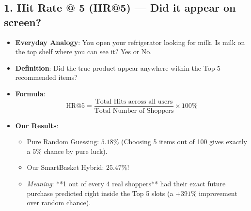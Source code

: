 \documentclass[11pt,a4paper]{article}
\begin{document}
\subsection{1. Hit Rate @ 5 (HR@5) --- Did it appear on screen?}
\begin{itemize}
    \item \textbf{Everyday Analogy}: You open your refrigerator looking for milk. Is milk on the top shelf where you can see it? Yes or No.
    \item \textbf{Definition}: Did the true product appear anywhere within the Top 5 recommended items?
    \item \textbf{Formula}:
    \begin{equation}
        \text{HR@5} = \frac{\text{Total Hits across all users}}{\text{Total Number of Shoppers}} \times 100\%
    \end{equation}
    \item \textbf{Our Results}:
    \begin{itemize}[noitemsep]
        \item Pure Random Guessing: $\mathbf{5.18\%}$ (Choosing 5 items out of 100 gives exactly a $5\%$ chance by pure luck).
        \item Our SmartBasket Hybrid: $\mathbf{25.47\%}$!
        \item \textit{Meaning}: **1 out of every 4 real shoppers** had their exact future purchase predicted right inside the Top 5 slots (a $+391\%$ improvement over random chance).
    \end{itemize}
\end{itemize}
\end{document}
